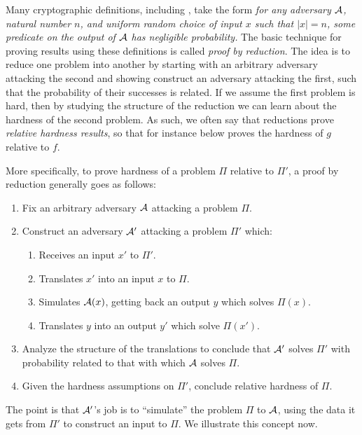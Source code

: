 Many cryptographic definitions, including ,
take the form \emph{for any adversary $\mathcal{A}$, natural number $n$, and uniform
random choice of input $x$ such that $|x| = n$, some predicate on the output
of $\mathcal{A}$ has negligible probability.} The basic technique for proving results
using these definitions is called \emph{proof by reduction}. The idea is to
reduce one problem into another by starting with an arbitrary adversary
attacking the second and showing construct an adversary attacking the first,
such that the probability of their successes is related. If we assume the first
problem is hard, then by studying the structure of the reduction we can learn
about the hardness of the second problem. As such, we often say that reductions
prove \emph{relative hardness results}, so that for instance 
below proves the hardness of $g$ relative to $f$.


More specifically, to prove hardness of a problem $\Pi$ relative to $\Pi'$, a
proof by reduction generally goes as follows:
\begin{enumerate}
  \item Fix an arbitrary adversary $\mathcal{A}$ attacking a problem $\Pi$.
  \item Construct an adversary $\mathcal{A}'$ attacking a problem $\Pi'$ which:
    \begin{enumerate}
      \item Receives an input $x'$ to $\Pi'$.
      \item Translates $x'$ into an input $x$ to $\Pi$.
      \item Simulates $\mathcal{A}(x)$, getting back an output $y$ which solves
        $\Pi(x)$.
      \item Translates $y$ into an output $y'$ which solve $\Pi(x')$.
    \end{enumerate}
  \item Analyze the structure of the translations to conclude that $\mathcal{A}'$ solves
    $\Pi'$ with probability related to that with which $\mathcal{A}$ solves $\Pi$.
  \item Given the hardness assumptions on $\Pi'$, conclude relative hardness of
    $\Pi$.
\end{enumerate}

The point is that $\mathcal{A}'$'s job is to ``simulate'' the problem $\Pi$ to $\mathcal{A}$,
using the data it gets from $\Pi'$ to construct an input to $\Pi$. We illustrate
this concept now.

